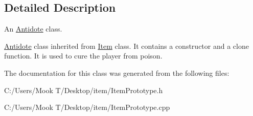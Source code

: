\subsection{Detailed Description}
An \hyperlink{class_antidote}{Antidote} class. 

\hyperlink{class_antidote}{Antidote} class inherited from \hyperlink{class_item}{Item} class. It contains a constructor and a clone function. It is used to cure the player from poison. 

The documentation for this class was generated from the following files\+:\begin{DoxyCompactItemize}
\item 
C\+:/\+Users/\+Mook T/\+Desktop/item/Item\+Prototype.\+h\item 
C\+:/\+Users/\+Mook T/\+Desktop/item/Item\+Prototype.\+cpp\end{DoxyCompactItemize}
